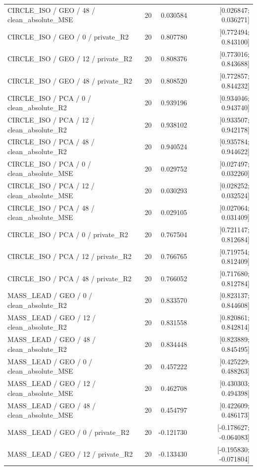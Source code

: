 \begin{longtable}{p{.56\linewidth}rrr}
CIRCLE\_ISO / GEO / 48 / clean\_absolute\_MSE & 20 & 0.030584 & [0.026847; 0.036271] \\
CIRCLE\_ISO / GEO / 0 / private\_R2 & 20 & 0.807780 & [0.772494; 0.843100] \\
CIRCLE\_ISO / GEO / 12 / private\_R2 & 20 & 0.808376 & [0.773016; 0.843688] \\
CIRCLE\_ISO / GEO / 48 / private\_R2 & 20 & 0.808520 & [0.772857; 0.844232] \\
CIRCLE\_ISO / PCA / 0 / clean\_absolute\_R2 & 20 & 0.939196 & [0.934046; 0.943740] \\
CIRCLE\_ISO / PCA / 12 / clean\_absolute\_R2 & 20 & 0.938102 & [0.933507; 0.942178] \\
CIRCLE\_ISO / PCA / 48 / clean\_absolute\_R2 & 20 & 0.940524 & [0.935784; 0.944622] \\
CIRCLE\_ISO / PCA / 0 / clean\_absolute\_MSE & 20 & 0.029752 & [0.027497; 0.032260] \\
CIRCLE\_ISO / PCA / 12 / clean\_absolute\_MSE & 20 & 0.030293 & [0.028252; 0.032524] \\
CIRCLE\_ISO / PCA / 48 / clean\_absolute\_MSE & 20 & 0.029105 & [0.027064; 0.031409] \\
CIRCLE\_ISO / PCA / 0 / private\_R2 & 20 & 0.767504 & [0.721147; 0.812684] \\
CIRCLE\_ISO / PCA / 12 / private\_R2 & 20 & 0.766765 & [0.719754; 0.812409] \\
CIRCLE\_ISO / PCA / 48 / private\_R2 & 20 & 0.766052 & [0.717680; 0.812784] \\
MASS\_LEAD / GEO / 0 / clean\_absolute\_R2 & 20 & 0.833570 & [0.823137; 0.844608] \\
MASS\_LEAD / GEO / 12 / clean\_absolute\_R2 & 20 & 0.831558 & [0.820861; 0.842814] \\
MASS\_LEAD / GEO / 48 / clean\_absolute\_R2 & 20 & 0.834448 & [0.823889; 0.845495] \\
MASS\_LEAD / GEO / 0 / clean\_absolute\_MSE & 20 & 0.457222 & [0.425229; 0.488263] \\
MASS\_LEAD / GEO / 12 / clean\_absolute\_MSE & 20 & 0.462708 & [0.430303; 0.494398] \\
MASS\_LEAD / GEO / 48 / clean\_absolute\_MSE & 20 & 0.454797 & [0.422609; 0.486173] \\
MASS\_LEAD / GEO / 0 / private\_R2 & 20 & -0.121730 & [-0.178627; -0.064083] \\
MASS\_LEAD / GEO / 12 / private\_R2 & 20 & -0.133430 & [-0.195830; -0.071804] \\

\end{longtable}
